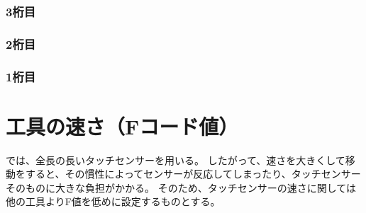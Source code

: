 \subsubsection{3桁目}



\subsubsection{2桁目}



\subsubsection{1桁目}




\clearpage
\section{工具の速さ（Fコード値）}
\DMname では、全長の長いタッチセンサーを用いる。
したがって、速さを大きくして移動をすると、その慣性によってセンサーが反応してしまったり、タッチセンサーそのものに大きな負担がかかる。
そのため、タッチセンサーの速さに関しては他の工具よりF値を低めに設定するものとする。




